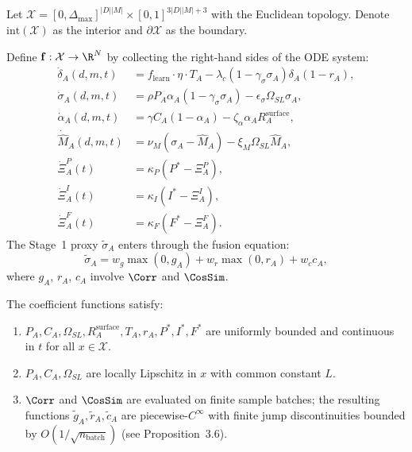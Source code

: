 
\begin{definition}
Let $\mathcal{X} = [0, \Delta_{\max}]^{|D||M|} \times [0,1]^{3|D||M| + 3}$
with the Euclidean topology. Denote $\text{int}(\mathcal{X})$ as the
interior and $\partial\mathcal{X}$ as the boundary.
\end{definition}

\begin{definition}
Define $\mathbf{f}: \mathcal{X} \to \R^N$ by collecting the right-hand
sides of the ODE system:
\begin{align*}
\dot{\delta}_A(d,m,t) &= f_{\text{learn}} \cdot \eta \cdot T_A
  - \lambda_c (1 - \gamma_\sigma \sigma_A) \delta_A (1 - r_A), \\
\dot{\sigma}_A(d,m,t) &=
  \rho P_A \alpha_A (1 - \gamma_\sigma \sigma_A) - \epsilon_\sigma \Omega_{SL} \sigma_A, \\
\dot{\alpha}_A(d,m,t) &=
  \gamma C_A (1 - \alpha_A) - \zeta_\alpha \alpha_A R_A^{\text{surface}}, \\
\dot{\hat{M}}_A(d,m,t) &=
  \nu_M (\sigma_A - \hat{M}_A) - \xi_M \Omega_{SL} \hat{M}_A, \\
\dot{\Xi}_A^P(t) &= \kappa_P (P^* - \Xi_A^P), \\
\dot{\Xi}_A^I(t) &= \kappa_I (I^* - \Xi_A^I), \\
\dot{\Xi}_A^F(t) &= \kappa_F (F^* - \Xi_A^F).
\end{align*}
The Stage~1 proxy $\tilde{\sigma}_A$ enters through the fusion equation:
\[
\tilde{\sigma}_A = w_g \max(0, g_A) + w_r \max(0, r_A) + w_c c_A,
\]
where $g_A$, $r_A$, $c_A$ involve $\Corr$ and $\CosSim$.
\end{definition}

\begin{assumption}
\label{assum:regularity}
The coefficient functions satisfy:
\begin{enumerate}[nosep]
\item $P_A, C_A, \Omega_{SL}, R_A^{\text{surface}}, T_A, r_A, P^*, I^*, F^*$
  are uniformly bounded and continuous in $t$ for all $x \in \mathcal{X}$.
\item $P_A, C_A, \Omega_{SL}$ are locally Lipschitz in $x$ with common
  constant $L$.
\item $\Corr$ and $\CosSim$ are evaluated on finite sample batches;
  the resulting functions $\tilde{g}_A, \tilde{r}_A, \tilde{c}_A$ are
  piecewise-$C^\infty$ with finite jump discontinuities bounded by
  $O(1/\sqrt{n_{\text{batch}}})$ (see Proposition~3.6).
\end{enumerate}
\end{assumption}

